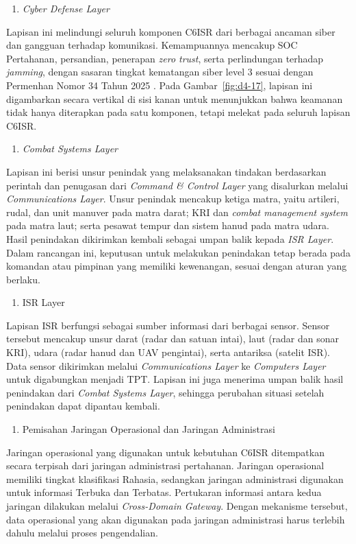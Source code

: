 \begin{enumerate}[label=\alph*., start=4]
  \item \textit{Cyber Defense Layer}
\end{enumerate}
Lapisan ini melindungi seluruh komponen C6ISR dari berbagai ancaman siber dan gangguan terhadap komunikasi. Kemampuannya mencakup SOC Pertahanan, persandian, penerapan \textit{zero trust}, serta perlindungan terhadap \textit{jamming}, dengan sasaran tingkat kematangan siber level 3 sesuai dengan Permenhan Nomor 34 Tahun 2025 \parencite{Permenhan34Tahun2025}. Pada Gambar~\ref{fig:d4-17}, lapisan ini digambarkan secara vertikal di sisi kanan untuk menunjukkan bahwa keamanan tidak hanya diterapkan pada satu komponen, tetapi melekat pada seluruh lapisan C6ISR.

\begin{enumerate}[label=\alph*., start=5]
  \item \textit{Combat Systems Layer}
\end{enumerate}
Lapisan ini berisi unsur penindak yang melaksanakan tindakan berdasarkan perintah dan penugasan dari \textit{Command \& Control Layer} yang disalurkan melalui \textit{Communications Layer}. Unsur penindak mencakup ketiga matra, yaitu artileri, rudal, dan unit manuver pada matra darat; KRI dan \textit{combat management system} pada matra laut; serta pesawat tempur dan sistem hanud pada matra udara. Hasil penindakan dikirimkan kembali sebagai umpan balik kepada \textit{ISR Layer}. Dalam rancangan ini, keputusan untuk melakukan penindakan tetap berada pada komandan atau pimpinan yang memiliki kewenangan, sesuai dengan aturan yang berlaku.

\begin{enumerate}[label=\alph*., start=6]
  \item ISR Layer
\end{enumerate}
Lapisan ISR berfungsi sebagai sumber informasi dari berbagai sensor. Sensor tersebut mencakup unsur darat (radar dan satuan intai), laut (radar dan sonar KRI), udara (radar hanud dan UAV pengintai), serta antariksa (satelit ISR). Data sensor dikirimkan melalui \textit{Communications Layer} ke \textit{Computers Layer} untuk digabungkan menjadi TPT. Lapisan ini juga menerima umpan balik hasil penindakan dari \textit{Combat Systems Layer}, sehingga perubahan situasi setelah penindakan dapat dipantau kembali.

\begin{enumerate}[label=\alph*., start=7]
  \item Pemisahan Jaringan Operasional dan Jaringan Administrasi
\end{enumerate}
Jaringan operasional yang digunakan untuk kebutuhan C6ISR ditempatkan secara terpisah dari jaringan administrasi pertahanan. Jaringan operasional memiliki tingkat klasifikasi Rahasia, sedangkan jaringan administrasi digunakan untuk informasi Terbuka dan Terbatas. Pertukaran informasi antara kedua jaringan dilakukan melalui \textit{Cross-Domain Gateway}. Dengan mekanisme tersebut, data operasional yang akan digunakan pada jaringan administrasi harus terlebih dahulu melalui proses pengendalian.

